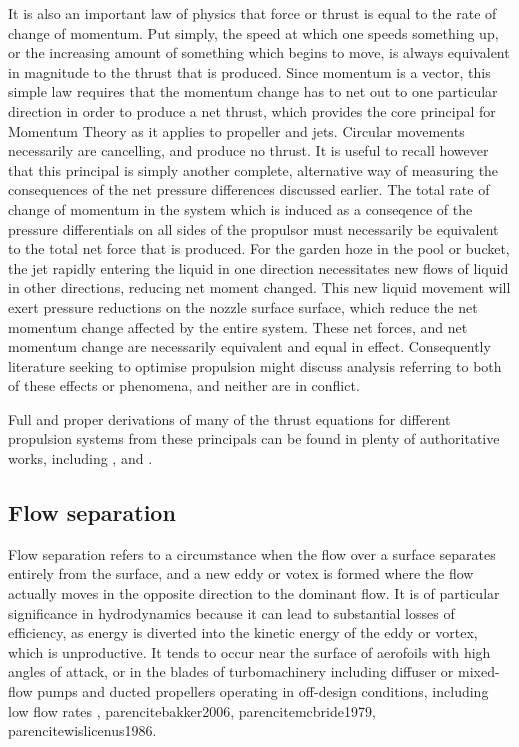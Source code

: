 \documentclass{article}\usepackage[]{graphicx}\usepackage[]{color}
\begin{document}
\begin{appendices}
It is also an important law of physics that force or thrust is equal to the rate of change of momentum. Put simply, the speed at which one speeds something up, or the increasing amount of something which begins to move, is always equivalent in magnitude to the thrust that is produced.  Since momentum is a vector, this simple law requires that the momentum change has to net out to one particular direction in order to produce a net thrust, which provides the core principal for Momentum Theory as it applies to propeller and jets.  Circular movements necessarily are cancelling, and produce no thrust. It is useful to recall however that this principal is simply another complete, alternative way of measuring the consequences of the net pressure differences discussed earlier.  The total rate of change of momentum in the system which is induced as a conseqence of the pressure differentials on all sides of the propulsor must necessarily be equivalent to the total net force that is produced.  For the garden hoze in the pool or bucket, the jet rapidly entering the liquid in one direction necessitates new flows of liquid in other directions, reducing net moment changed. This new liquid movement will exert pressure reductions on the nozzle surface surface, which reduce the net momentum change affected by the entire system.  These net forces, and net momentum change are necessarily equivalent and equal in effect.  Consequently literature seeking to optimise propulsion might discuss analysis referring to both of these effects or phenomena, and neither are in conflict.

Full and proper derivations of many of the thrust equations for different propulsion systems from these principals can be found in plenty of authoritative works, including \cite{lewis1988}, \cite{carlton2007} and \cite{mollard2011}.

\subsection{Flow separation}
Flow separation refers to a circumstance when the flow over a surface separates entirely from the surface, and a new eddy or votex is formed where the flow actually moves in the opposite direction to the dominant flow.  It is of particular significance in hydrodynamics because it can lead to substantial losses of efficiency, as energy is diverted into the kinetic energy of the eddy or vortex, which is unproductive. It tends to occur near the surface of aerofoils with high angles of attack, or in the blades of turbomachinery including diffuser or mixed-flow pumps and ducted propellers operating in off-design conditions, including low flow rates \parencite{li2013}, parencite{bakker2006}, parencite{mcbride1979}, parencite{wislicenus1986}.


\end{appendices}
\end{document}
